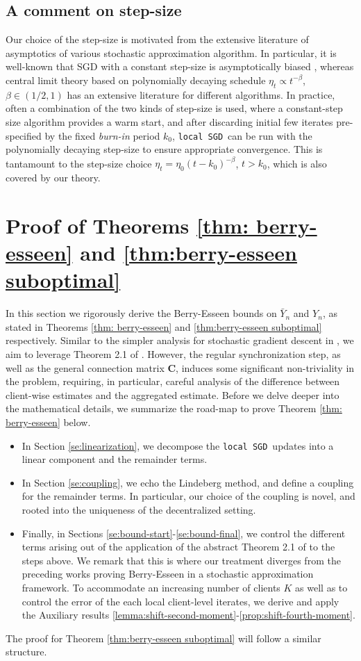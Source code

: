 \documentclass[a4paper,11pt]{article}
\numberwithin{equation}{section}
\theoremstyle{plain}
\theoremstyle{remark}
\def\bC{\mathbf{C}}
\newcommand{\DFL}{\texttt{local SGD}}
\begin{document}
\subsection{A comment on step-size}
 Our choice of the step-size is motivated from the extensive literature of asymptotics of various stochastic approximation algorithm. In particular, it is well-known that SGD with a constant step-size is asymptotically biased \cite{dieuleveut20, listochastic, glasgowdfl2022}, whereas central limit theory based on polynomially decaying schedule $\eta_t\propto t^{-\beta}$, $\beta\in(1/2,1)$ has an extensive literature for different algorithms. In practice, often a combination of the two kinds of step-size is used, where a constant-step size algorithm provides a warm start, and after discarding initial few iterates pre-specified by the fixed \textit{burn-in} period $k_0$, \DFL\ can be run with the polynomially decaying step-size to ensure appropriate convergence. This is tantamount to the step-size choice $\eta_{t}= \eta_0 (t-k_0)^{-\beta}$, $t>k_0$, which is also covered by our theory.
\section{Proof of Theorems \ref{thm: berry-esseen} and \ref{thm:berry-esseen suboptimal}}\label{se:proof-1}
In this section we rigorously derive the Berry-Esseen bounds on $\bar{Y}_n$ and $Y_n$, as stated in Theorems \ref{thm: berry-esseen} and \ref{thm:berry-esseen suboptimal} respectively. Similar to the simpler analysis for stochastic gradient descent in \cite{samsonov2024gaussian}, we aim to leverage Theorem 2.1 of \cite{shao-berry-esseen}. However, the regular synchronization step, as well as the general connection matrix $\bC$, induces some significant non-triviality in the problem, requiring, in particular, careful analysis of the difference between client-wise estimates and the aggregated estimate. Before we delve deeper into the mathematical details, we summarize the road-map to prove Theorem \ref{thm: berry-esseen} below. 
\begin{itemize}
    \item In Section \ref{se:linearization}, we decompose the \DFL\ updates into a linear component and the remainder terms.
    \item In Section \ref{se:coupling}, we echo the Lindeberg method, and define a coupling for the remainder terms. In particular, our choice of the coupling is novel, and rooted into the uniqueness of the decentralized setting. 
    \item Finally, in Sections \ref{se:bound-start}-\ref{se:bound-final}, we control the different terms arising out of the application of the abstract Theorem 2.1 of \cite{shao-berry-esseen} to the steps above. We remark that this is where our treatment diverges from the preceding works proving Berry-Esseen in a stochastic approximation framework. To accommodate an increasing number of clients $K$ as well as to control the error of the each local client-level iterates, we derive and apply the Auxiliary results \ref{lemma:shift-second-moment}-\ref{prop:shift-fourth-moment}. 
\end{itemize}
The proof for Theorem \ref{thm:berry-esseen suboptimal} will follow a similar structure.
\end{document}
